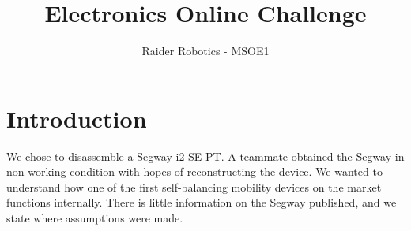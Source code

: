 \documentclass[]{formalLabReport}
\begin{document}
\title{Electronics Online Challenge}
\author{Raider Robotics - MSOE1}

\maketitle

\tableofcontents

\listoftables

\listoffigures

\newpage

\section{Introduction}
We chose to disassemble a Segway i2 SE PT. A teammate obtained the Segway in non-working condition with hopes of reconstructing the device. We wanted to understand how one of the first self-balancing mobility devices on the market functions internally. There is little information on the Segway published, and we state where assumptions were made.
\end{document}
